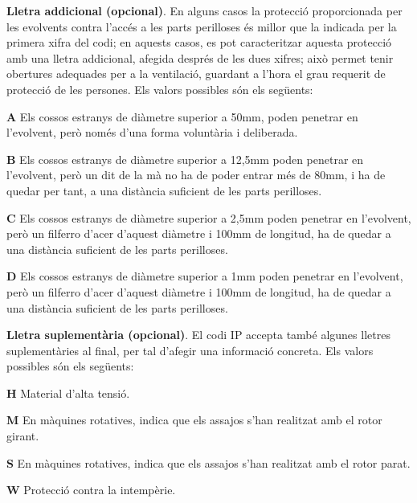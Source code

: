 \textbf{Lletra addicional (opcional)}. En alguns casos la protecci\'{o}
proporcionada per les evolvents contra l'acc\'{e}s a les parts
perilloses \'{e}s millor que la indicada per la primera xifra del codi;
en aquests casos, es pot caracteritzar aquesta protecci\'{o} amb una
lletra addicional, afegida despr\'{e}s de les dues xifres; aix\`{o} permet
tenir obertures adequades per a la ventilaci\'{o},  guardant a l'hora el
grau requerit de protecci\'{o} de les persones. Els valors possibles s\'{o}n
els seg\"{u}ents:
\begin{multicols}{2}
\begin{list}{}
   {\setlength{\labelwidth}{5mm} \setlength{\leftmargin}{5mm} \setlength{\labelsep}{2mm}}
   \item[\textbf{A}] Els  cossos estranys de di\`{a}metre superior a
   50\unit{mm},
    poden penetrar en l'evolvent, per\`{o} nom\'{e}s d'una forma volunt\`{a}ria i deliberada.
   \item[\textbf{B}] Els  cossos estranys de di\`{a}metre superior a 12,5\unit{mm}
    poden penetrar en l'evolvent, per\`{o} un dit de la m\`{a} no ha de poder entrar m\'{e}s de 80\unit{mm}, i
    ha de quedar per tant, a una dist\`{a}ncia    suficient de les parts perilloses.
   \item[\textbf{C}] Els  cossos estranys de di\`{a}metre superior a 2,5\unit{mm}
   poden penetrar en l'evolvent, per\`{o} un filferro d'acer d'aquest di\`{a}metre i 100\unit{mm}
   de longitud, ha de quedar a una dist\`{a}ncia suficient de les parts perilloses.
   \item[\textbf{D}] Els  cossos estranys de di\`{a}metre superior a 1\unit{mm}
   poden penetrar en l'evolvent, per\`{o} un filferro d'acer d'aquest di\`{a}metre i 100\unit{mm}
   de longitud, ha de quedar a una dist\`{a}ncia suficient de les parts perilloses.
\end{list}
\end{multicols}

\textbf{Lletra suplement\`{a}ria (opcional)}. El codi \textsf{IP} accepta tamb\'{e} algunes
lletres suplement\`{a}ries al final, per tal d'afegir una informaci\'{o} concreta. Els valors
possibles s\'{o}n els seg\"{u}ents:
\begin{multicols}{2}
\begin{list}{}
   {\setlength{\labelwidth}{6mm} \setlength{\leftmargin}{6mm} \setlength{\labelsep}{2mm}}
   \item[\textbf{H}] Material d'alta tensi\'{o}.
   \item[\textbf{M}] En m\`{a}quines rotatives, indica que els assajos s'han realitzat amb el
    rotor girant.
   \item[\textbf{S}] En m\`{a}quines rotatives, indica que els assajos s'han realitzat amb el
    rotor parat.
   \item[\textbf{W}] Protecci\'{o} contra la intemp\`{e}rie.
\end{list}
\end{multicols}

